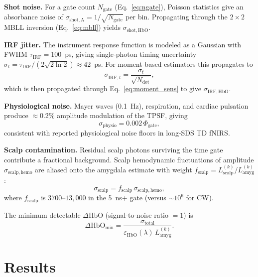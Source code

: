 \documentclass[11pt,a4paper]{article}
\begin{document}
\textbf{Shot noise.} For a gate count $N_\mathrm{gate}$ (Eq.~\ref{eq:ngate}), Poisson statistics give an absorbance noise of $\sigma_\mathrm{shot,A} = 1/\sqrt{N_\mathrm{gate}}$ per bin. Propagating through the $2\times 2$ MBLL inversion (Eq.~\ref{eq:mbll}) yields $\sigma_\mathrm{shot,HbO}$.

\textbf{IRF jitter.} The instrument response function is modeled as a Gaussian with FWHM $\tau_\mathrm{IRF} = 100$~ps, giving single-photon timing uncertainty $\sigma_t = \tau_\mathrm{IRF}/(2\sqrt{2\ln 2}) \approx 42$~ps. For moment-based estimators this propagates to
\begin{equation}
    \sigma_{\mathrm{IRF},\bar{t}} = \frac{\sigma_t}{\sqrt{N_\mathrm{det}}},
\end{equation}
which is then propagated through Eq.~\ref{eq:moment_sens} to give $\sigma_\mathrm{IRF,HbO}$.

\textbf{Physiological noise.} Mayer waves (0.1~Hz), respiration, and cardiac pulsation produce $\approx 0.2\%$ amplitude modulation of the TPSF, giving
\begin{equation}
    \sigma_\mathrm{physio} = 0.002\,\Phi_\mathrm{gate},
\end{equation}
consistent with reported physiological noise floors in long-SDS TD fNIRS\cite{selb2014improved}.

\textbf{Scalp contamination.} Residual scalp photons surviving the time gate contribute a fractional background. Scalp hemodynamic fluctuations of amplitude $\sigma_\mathrm{scalp,hemo}$ are aliased onto the amygdala estimate with weight $f_\mathrm{scalp} = L_\mathrm{scalp}^{(k)} / L_\mathrm{amyg}^{(k)}$:
\begin{equation}
    \sigma_\mathrm{scalp} = f_\mathrm{scalp}\,\sigma_\mathrm{scalp,hemo},
\end{equation}
where $f_\mathrm{scalp}$ is $3700$--$13{,}000$ in the 5~ns+ gate (versus $\sim 10^6$ for CW).

The minimum detectable $\Delta\mathrm{HbO}$ (signal-to-noise ratio $= 1$) is
\begin{equation}
    \Delta\mathrm{HbO}_\mathrm{min} =
    \frac{\sigma_\mathrm{total}}{\varepsilon_\mathrm{HbO}(\lambda)\,L_\mathrm{amyg}^{(k)}}.
    \label{eq:sens}
\end{equation}


\section{Results}
\end{document}

